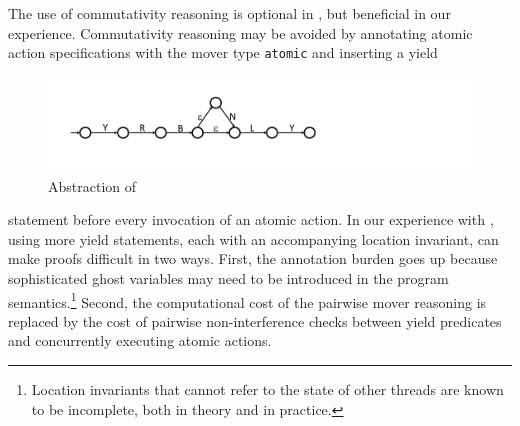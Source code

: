 The use of commutativity reasoning is optional in \civl, but beneficial in our experience. 
Commutativity reasoning may be avoided by annotating atomic action
specifications with the mover type {\tt atomic} and inserting a yield 
\begin{figure}
\vspace*{-1cm}
\begin{center}
\includegraphics[scale=0.25]{WBSlow.pdf}
\end{center}
\vspace*{-0.8cm}
\caption{Abstraction of }
\label{fig:midwb}
\end{figure}
statement before every invocation of an atomic action.
In our experience with \civl, using more yield statements,
each with an accompanying location invariant, can make proofs difficult in two ways.
First, the annotation burden goes up because sophisticated ghost variables may need to be introduced in the 
program semantics.\footnote{Location invariants that cannot refer to the state of other threads are known to be incomplete, 
both in theory and in practice.}
Second, the computational cost of the pairwise mover reasoning is replaced by the cost of pairwise non-interference checks between yield predicates 
and concurrently executing atomic actions. 

